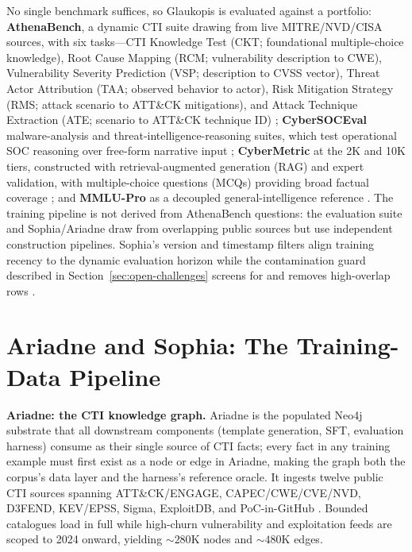 \documentclass[conference]{IEEEtran}
\begin{document}
No single benchmark suffices, so Glaukopis is evaluated against a portfolio: \textbf{AthenaBench}, a dynamic CTI suite drawing from live MITRE/NVD/CISA sources, with six tasks---CTI Knowledge Test (CKT; foundational multiple-choice knowledge), Root Cause Mapping (RCM; vulnerability description to CWE), Vulnerability Severity Prediction (VSP; description to CVSS vector), Threat Actor Attribution (TAA; observed behavior to actor), Risk Mitigation Strategy (RMS; attack scenario to ATT\&CK mitigations), and Attack Technique Extraction (ATE; scenario to ATT\&CK technique ID) \cite{athenabench2025}; \textbf{CyberSOCEval} malware-analysis and threat-intelligence-reasoning suites, which test operational SOC reasoning over free-form narrative input \cite{cybersoceval2025}; \textbf{CyberMetric} at the 2K and 10K tiers, constructed with retrieval-augmented generation (RAG) and expert validation, with multiple-choice questions (MCQs) providing broad factual coverage \cite{tihanyi2024cybermetric}; and \textbf{MMLU-Pro} as a decoupled general-intelligence reference \cite{wang2024mmlupro}. The training pipeline is not derived from AthenaBench questions: the evaluation suite and Sophia/Ariadne draw from overlapping public sources but use independent construction pipelines. Sophia's version and timestamp filters align training recency to the dynamic evaluation horizon while the contamination guard described in Section~\ref{sec:open-challenges} screens for and removes high-overlap rows \cite{athenabench2025}.

\section{Ariadne and Sophia: The Training-Data Pipeline}
\label{sec:cti-kg}

\textbf{Ariadne: the CTI knowledge graph.} Ariadne is the populated Neo4j substrate that all downstream components (template generation, SFT, evaluation harness) consume as their single source of CTI facts; every fact in any training example must first exist as a node or edge in Ariadne, making the graph both the corpus's data layer and the harness's reference oracle. It ingests twelve public CTI sources spanning ATT\&CK/ENGAGE, CAPEC/CWE/CVE/NVD, D3FEND, KEV/EPSS, Sigma, ExploitDB, and PoC-in-GitHub \cite{strom2018mitreattck,mitreCAPEC,mitreCWE,mitreCVE}. Bounded catalogues load in full while high-churn vulnerability and exploitation feeds are scoped to 2024 onward, yielding ${\sim}280$K nodes and ${\sim}480$K edges.
\end{document}
